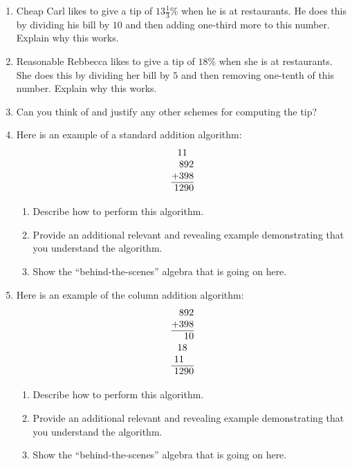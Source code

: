 \begin{problems}
\begin{enumerate}
\item Cheap Carl likes to give a tip of $13\frac{1}{3}$\% when he is
  at restaurants. He does this by dividing his bill by $10$ and then
  adding one-third more to this number. Explain why this works.
\item Reasonable Rebbecca likes to give a tip of $18$\% when she is at
  restaurants. She does this by dividing her bill by $5$ and then
  removing one-tenth of this number. Explain why this works.
\item Can you think of and justify any other schemes for computing the
  tip?
\item Here is an example of a standard addition algorithm:
\[
\begin{array}{@{}r@{}}
11~~\\
892\\
+398\\ \hline
1290
\end{array}
\]
\begin{enumerate}
\item Describe how to perform this algorithm.
\item Provide an additional relevant and revealing example
  demonstrating that you understand the algorithm.
\item Show the ``behind-the-scenes'' algebra that is going on here.
\end{enumerate}
\item Here is an example of the column addition
  algorithm:
\[
\begin{array}{@{}r@{}}
892\\
+398\\ \hline
10\\
18~~\\
11~~~\\ \hline
1290
\end{array}
\]
\begin{enumerate}
\item Describe how to perform this algorithm.
\item Provide an additional relevant and revealing example
  demonstrating that you understand the algorithm.
\item Show the ``behind-the-scenes'' algebra that is going on here.
\end{enumerate}


\end{enumerate}
\end{problems}
